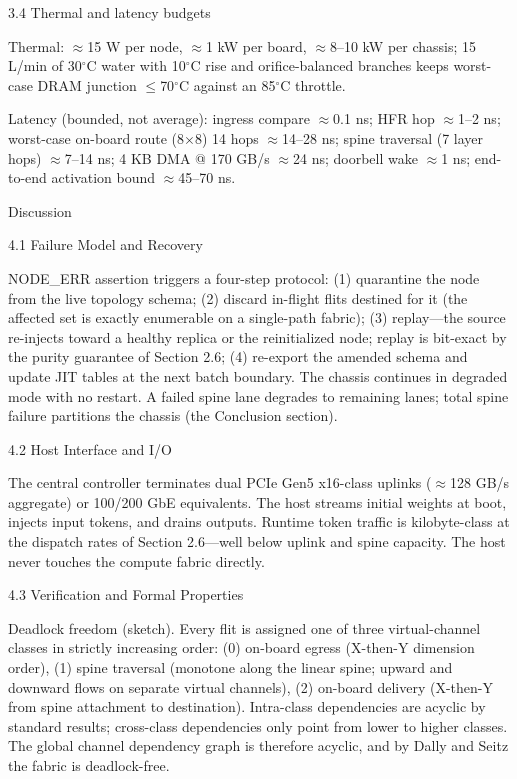 \documentclass[10pt,twocolumn]{article}
\begin{document}
3.4 Thermal and latency budgets

Thermal: $\approx$15 W per node, $\approx$1 kW per board, $\approx$8--10 kW per chassis; 15 L/min of 30$^\circ$C water with 10$^\circ$C rise and orifice-balanced branches keeps worst-case DRAM junction $\leq$70$^\circ$C against an 85$^\circ$C throttle.

Latency (bounded, not average): ingress compare $\approx$0.1 ns; HFR hop $\approx$1--2 ns; worst-case on-board route (8$\times$8) 14 hops $\approx$14--28 ns; spine traversal (7 layer hops) $\approx$7--14 ns; 4 KB DMA @ 170 GB/s $\approx$24 ns; doorbell wake $\approx$1 ns; end-to-end activation bound $\approx$45--70 ns.

Discussion

4.1 Failure Model and Recovery

NODE\_ERR assertion triggers a four-step protocol: (1) quarantine the node from the live topology schema; (2) discard in-flight flits destined for it (the affected set is exactly enumerable on a single-path fabric); (3) replay---the source re-injects toward a healthy replica or the reinitialized node; replay is bit-exact by the purity guarantee of Section 2.6; (4) re-export the amended schema and update JIT tables at the next batch boundary. The chassis continues in degraded mode with no restart. A failed spine lane degrades to remaining lanes; total spine failure partitions the chassis (the Conclusion section).

4.2 Host Interface and I/O

The central controller terminates dual PCIe Gen5 x16-class uplinks ($\approx$128 GB/s aggregate) or 100/200 GbE equivalents. The host streams initial weights at boot, injects input tokens, and drains outputs. Runtime token traffic is kilobyte-class at the dispatch rates of Section 2.6---well below uplink and spine capacity. The host never touches the compute fabric directly.

4.3 Verification and Formal Properties

Deadlock freedom (sketch). Every flit is assigned one of three virtual-channel classes in strictly increasing order: (0) on-board egress (X-then-Y dimension order), (1) spine traversal (monotone along the linear spine; upward and downward flows on separate virtual channels), (2) on-board delivery (X-then-Y from spine attachment to destination). Intra-class dependencies are acyclic by standard results; cross-class dependencies only point from lower to higher classes. The global channel dependency graph is therefore acyclic, and by Dally and Seitz the fabric is deadlock-free\cite{13,14}.
\end{document}

